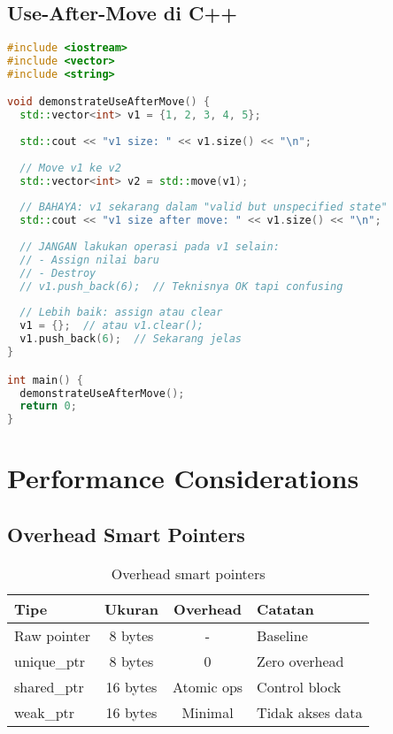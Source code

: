 \documentclass[../main.tex]{subfiles}
\begin{document}
\subsection{Use-After-Move di C++}
\begin{lstlisting}[language=C++, caption={Use-after-move error}]
#include <iostream>
#include <vector>
#include <string>

void demonstrateUseAfterMove() {
  std::vector<int> v1 = {1, 2, 3, 4, 5};
  
  std::cout << "v1 size: " << v1.size() << "\n";
  
  // Move v1 ke v2
  std::vector<int> v2 = std::move(v1);
  
  // BAHAYA: v1 sekarang dalam "valid but unspecified state"
  std::cout << "v1 size after move: " << v1.size() << "\n";
  
  // JANGAN lakukan operasi pada v1 selain:
  // - Assign nilai baru
  // - Destroy
  // v1.push_back(6);  // Teknisnya OK tapi confusing
  
  // Lebih baik: assign atau clear
  v1 = {};  // atau v1.clear();
  v1.push_back(6);  // Sekarang jelas
}

int main() {
  demonstrateUseAfterMove();
  return 0;
}
\end{lstlisting}

\section{Performance Considerations}

\subsection{Overhead Smart Pointers}
\begin{table}[H]
  \centering
  \caption{Overhead smart pointers}
  \begin{tabular}{@{}lccl@{}}
    \toprule
    Tipe & Ukuran & Overhead & Catatan \\
    \midrule
    Raw pointer & 8 bytes & - & Baseline \\
    unique\_ptr & 8 bytes & 0 & Zero overhead \\
    shared\_ptr & 16 bytes & Atomic ops & Control block \\
    weak\_ptr & 16 bytes & Minimal & Tidak akses data \\
    \bottomrule
  \end{tabular}
\end{table}
\end{document}
